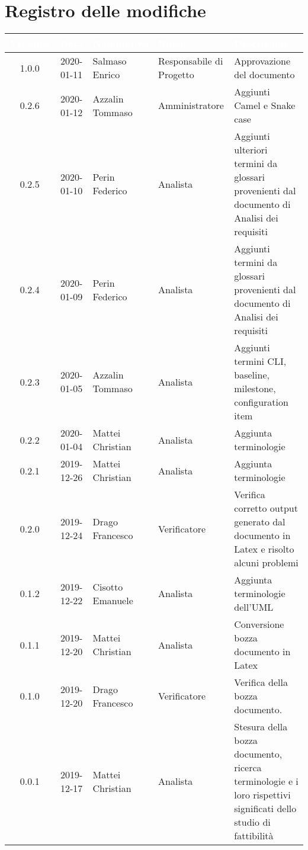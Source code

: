 \section*{Registro delle modifiche}
{
\renewcommand{\arraystretch}{1.5}
\centering
\begin{longtable}{ c c  C{4cm}  C{3cm} C{4cm}}
\textcolor{white}{\textbf{Versione}} & \textcolor{white}{\textbf{Data}} & \textcolor{white}{\textbf{Nominativo}} & \textcolor{white}{\textbf{Ruolo}} & \textcolor{white}{\textbf{Descrizione}}\\	
\endhead


1.0.0 & 2020-01-11 & Salmaso Enrico & Responsabile di Progetto & Approvazione del documento \\

0.2.6 & 2020-01-12 & Azzalin Tommaso & Amministratore & Aggiunti Camel e Snake case \\

0.2.5 & 2020-01-10 & Perin Federico & Analista & Aggiunti ulteriori termini da glossari provenienti dal documento di Analisi dei requisiti \\

0.2.4 & 2020-01-09 & Perin Federico & Analista & Aggiunti termini da glossari provenienti dal documento di Analisi dei requisiti \\

0.2.3 & 2020-01-05 & Azzalin Tommaso & Analista & Aggiunti termini CLI, baseline, milestone, configuration item \\

0.2.2 & 2020-01-04 & Mattei Christian & Analista & Aggiunta terminologie \\

0.2.1 & 2019-12-26 & Mattei Christian & Analista & Aggiunta terminologie \\

0.2.0 & 2019-12-24 & Drago Francesco & Verificatore & Verifica corretto output generato dal documento in Latex e risolto alcuni problemi\\

0.1.2 & 2019-12-22 & Cisotto Emanuele & Analista & Aggiunta terminologie dell'UML \\

0.1.1 & 2019-12-20 & Mattei Christian & Analista & Conversione bozza documento in Latex\\
		
0.1.0 & 2019-12-20 & Drago Francesco & Verificatore & Verifica della bozza documento.  \\
		
0.0.1 & 2019-12-17 & Mattei Christian & Analista & Stesura della bozza documento, ricerca terminologie e i loro rispettivi significati dello studio di fattibilità \\
		
\end{longtable}
}
